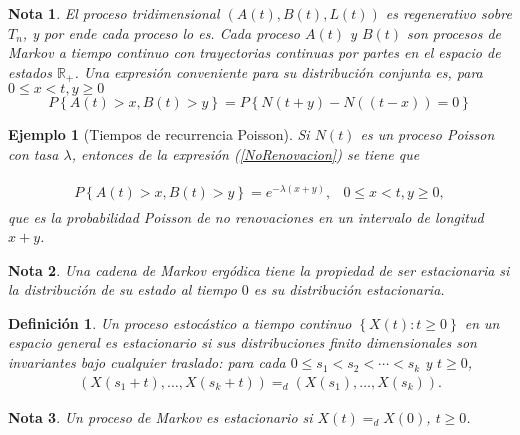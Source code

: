 \documentclass{article}
\newtheorem{Def}{Definición}[section]
\newtheorem{Ejem}{Ejemplo}[section]
\newtheorem{Note}{Nota}[section]
\newcommand{\rea}{\mathbb{R}}
\numberwithin{equation}{section}
\begin{document}
\begin{Note}
El proceso tridimensional $\left(A\left(t\right),B\left(t\right),L\left(t\right)\right)$ es regenerativo sobre $T_{n}$, y por ende cada proceso lo es. Cada proceso $A\left(t\right)$ y $B\left(t\right)$ son procesos de Markov a tiempo continuo con trayectorias continuas por partes en el espacio de estados $\rea_{+}$. Una expresi\'on conveniente para su distribuci\'on conjunta es, para $0\leq x<t,y\geq0$
\begin{equation}\label{NoRenovacion}
P\left\{A\left(t\right)>x,B\left(t\right)>y\right\}=
P\left\{N\left(t+y\right)-N\left((t-x)\right)=0\right\}
\end{equation}
\end{Note}

\begin{Ejem}[Tiempos de recurrencia Poisson]
Si $N\left(t\right)$ es un proceso Poisson con tasa $\lambda$, entonces de la expresi\'on (\ref{NoRenovacion}) se tiene que

\begin{eqnarray*}
\begin{array}{lc}
P\left\{A\left(t\right)>x,B\left(t\right)>y\right\}=e^{-\lambda\left(x+y\right)},&0\leq x<t,y\geq0,
\end{array}
\end{eqnarray*}
que es la probabilidad Poisson de no renovaciones en un intervalo de longitud $x+y$.
\end{Ejem}

\begin{Note}
Una cadena de Markov erg\'odica tiene la propiedad de ser estacionaria si la distribuci\'on de su estado al tiempo $0$ es su distribuci\'on estacionaria.
\end{Note}

\begin{Def}
Un proceso estoc\'astico a tiempo continuo $\left\{X\left(t\right):t\geq0\right\}$ en un espacio general es estacionario si sus distribuciones finito dimensionales son invariantes bajo cualquier  traslado: para cada $0\leq s_{1}<s_{2}<\cdots<s_{k}$ y $t\geq0$,
\begin{eqnarray*}
\left(X\left(s_{1}+t\right),\ldots,X\left(s_{k}+t\right)\right)=_{d}\left(X\left(s_{1}\right),\ldots,X\left(s_{k}\right)\right).
\end{eqnarray*}
\end{Def}

\begin{Note}
Un proceso de Markov es estacionario si $X\left(t\right)=_{d}X\left(0\right)$, $t\geq0$.
\end{Note}
\end{document}
